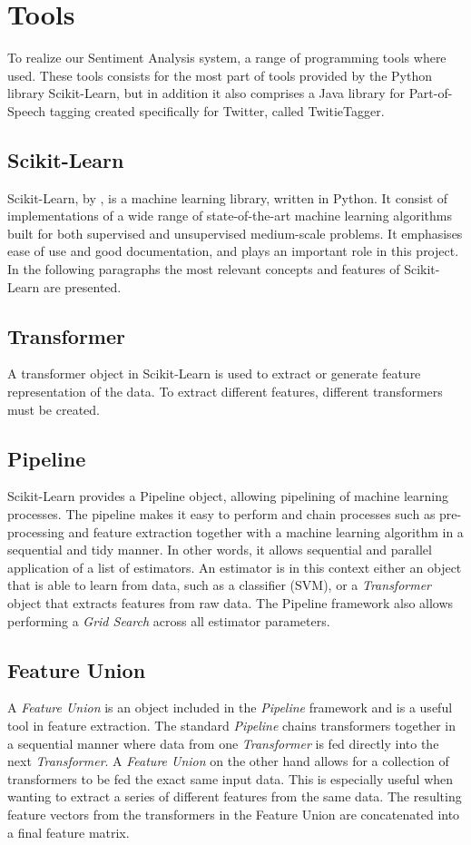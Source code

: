 \section{Tools}
\label{sec:background_tools}
To realize our Sentiment Analysis system, a range of programming tools where used. These tools consists for the most part of tools provided by the Python library Scikit-Learn, but in addition it also comprises a Java library for Part-of-Speech tagging created specifically for Twitter, called TwitieTagger.

\subsection{Scikit-Learn}
\label{sec:background_scikit}
Scikit-Learn, by \cite{scikit-learn}, is a machine learning library, written in Python. It consist of implementations of a wide range of state-of-the-art machine learning algorithms built for both supervised and unsupervised medium-scale problems. It emphasises ease of use and good documentation, and plays an important role in this project. In the following paragraphs the most relevant concepts and features of Scikit-Learn are presented.

\subsection*{Transformer}
A transformer object in Scikit-Learn is used to extract or generate feature representation of the data. To extract different features, different transformers must be created.

\subsection*{Pipeline}
Scikit-Learn provides a Pipeline object, allowing pipelining of machine learning processes. The pipeline makes it easy to perform and chain processes such as pre-processing and feature extraction together with a machine learning algorithm in a sequential and tidy manner. In other words, it allows sequential and parallel application of a list of estimators. An estimator is in this context either an object that is able to learn from data, such as a classifier (SVM), or a \textit{Transformer} object that extracts features from raw data. The Pipeline framework also allows performing a \textit{Grid Search} across all estimator parameters. 

\subsection*{Feature Union}
A \textit{Feature Union} is an object included in the \textit{Pipeline} framework and is a useful tool in feature extraction. The standard \textit{Pipeline} chains transformers together in a sequential manner where data from one \textit{Transformer} is fed directly into the next \textit{Transformer}. A \textit{Feature Union} on the other hand allows for a collection of transformers to be fed the exact same input data. This is especially useful when wanting to extract a series of different features from the same data. The resulting feature vectors from the transformers in the Feature Union are concatenated into a final feature matrix. 

